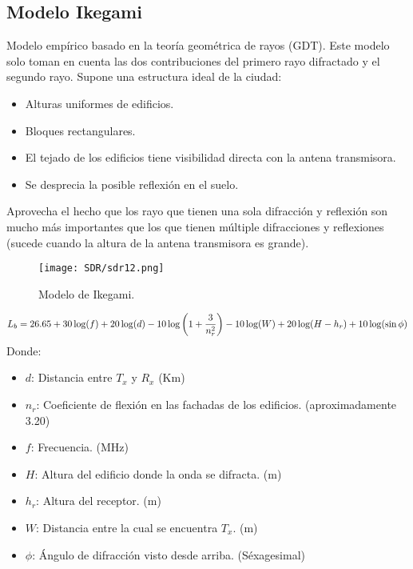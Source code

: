 \documentclass[
	12pt, %
	fleqn, %
	a4paper, %
	oneside, %
]{LegrandOrangeBook}
\begin{document}
\subsection{Modelo Ikegami}
Modelo empírico basado en la teoría geométrica de rayos (GDT). Este modelo solo toman en cuenta las dos contribuciones del primero rayo difractado y el segundo rayo. Supone una estructura ideal de la ciudad:
\begin{itemize}
\item Alturas uniformes de edificios.
\item Bloques rectangulares.
\item El tejado de los edificios tiene visibilidad directa con la antena transmisora.
\item Se desprecia la posible reflexión en el suelo.
\end{itemize}
Aprovecha el hecho que los rayo que tienen una sola difracción y reflexión son mucho más importantes que los que tienen múltiple difracciones y reflexiones (sucede cuando la altura de la antena transmisora es grande).
\begin{figure}[H]
\centering
\texttt{[image: SDR/sdr12.png]}
\caption{Modelo de Ikegami.}
\end{figure}
\begin{equation}
L_b=26.65+30\log(f)+20\log(d)-10\log\left(1+\frac{3}{n_r^2}\right)-10\log(W)+20\log(H-h_r)+10\log(\sin\phi)
\end{equation}
Donde:
\begin{itemize}
\item $d$: Distancia entre $T_x$ y $R_x$ (Km)
\item $n_r$: Coeficiente de flexión en las fachadas de los edificios. (aproximadamente 3.20)
\item $f$: Frecuencia. (MHz)
\item $H$: Altura del edificio donde la onda se difracta. (m)
\item $h_r$: Altura del receptor. (m)
\item $W$: Distancia entre la cual se encuentra $T_x$. (m)
\item $\phi$: Ángulo de difracción visto desde arriba. (Séxagesimal)
\end{itemize}
\end{document}
